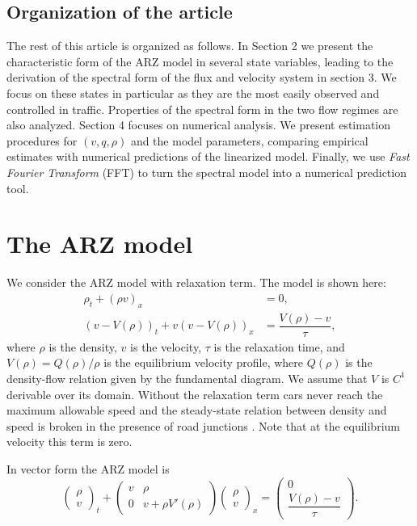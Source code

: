 \documentclass[preprint]{elsarticle}
\begin{document}
\subsection{Organization of the article}
The rest of this article is organized as follows. In Section 2 we present the characteristic form of the ARZ model in several state variables, leading to the derivation of the spectral form of the flux and velocity system in section 3. We focus on these states in particular as they are the most easily observed and controlled in traffic. Properties of the spectral form in the two flow regimes are also analyzed. Section 4 focuses on numerical analysis. We present estimation procedures for $(v,q,\rho)$ and the model parameters, comparing empirical estimates with numerical predictions of the linearized model. Finally, we use \textit{Fast Fourier Transform} (FFT) to turn the spectral model into a numerical prediction tool.


\section{The ARZ model} \label{ARZSection}


We consider the ARZ model with relaxation term. The model is shown here: 
\begin{align} 
\rho_t + (\rho v)_x &= 0, \label{ARZ1} \\
(v - V(\rho))_t + v(v - V(\rho))_x &=\dfrac{V(\rho) - v}{\tau} \label{ARZ2},
\end{align}
where $\rho$ is the density, $v$ is the velocity, $\tau$ is the relaxation time, and $V(\rho) = Q(\rho)/\rho$ is the equilibrium velocity profile, where $Q(\rho)$ is the density-flow relation given by the fundamental diagram. We assume that $V$ is $C^{1}$ derivable over its domain. Without the relaxation term cars never reach the maximum allowable speed \cite{R_improved} and the steady-state relation between density and speed is broken in the presence of road junctions \cite{jin2015}. Note that at the equilibrium velocity this term is zero. 

In vector form the ARZ model is
\begin{equation} \label{ARZrhov}
\begin{pmatrix}
\rho \\ v
\end{pmatrix}_t
+ \begin{pmatrix}
v & \rho \\
0 & v + \rho V' (\rho)
\end{pmatrix}
\begin{pmatrix}
\rho \\ v
\end{pmatrix}_x = 
\begin{pmatrix}
0 \\ \dfrac{V(\rho) - v}{\tau}
\end{pmatrix}.
\end{equation}
\end{document}
